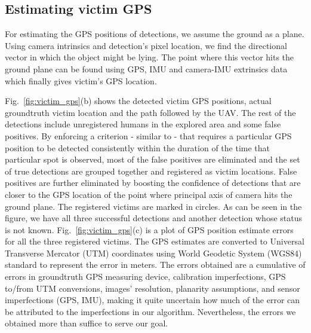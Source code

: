 \documentclass[runningheads]{llncs}
\begin{document}
\subsection{Estimating victim GPS}

For estimating the GPS positions of detections, we assume the ground as a plane. Using camera intrinsics and detection's pixel location, we find the directional vector in which the object might be lying. The point where this vector hits the ground plane can be found using GPS, IMU and camera-IMU extrinsics data which finally gives victim's GPS location.

Fig.~\ref{fig:victim_gps}(b) shows the detected victim GPS positions, actual groundtruth victim location and the path followed by the UAV. The rest of the detections include unregistered humans in the explored area and some false positives. By enforcing a criterion - similar to \cite{rudol2008human} - that requires a particular GPS position to be detected consistently within the duration of the time that particular spot is observed, most of the false positives are eliminated and the set of true detections are grouped together and registered as victim locations. False positives are further eliminated by boosting the confidence of detections that are closer to the GPS location of the point where principal axis of camera hits the ground plane. The registered victims are marked in circles. As can be seen in the figure, we have all three successful detections and another detection whose status is not known. Fig.~\ref{fig:victim_gps}(c) is a plot of GPS position estimate errors for all the three registered victims. The GPS estimates are converted to Universal Transverse Mercator (UTM) coordinates using World Geodetic System (WGS84) standard \cite{WGS} to represent the error in meters. The errors obtained are a cumulative of errors in groundtruth GPS measuring device, calibration imperfections, GPS to/from UTM conversions, images' resolution, planarity assumptions, and sensor imperfections (GPS, IMU), making it quite uncertain how much of the error can be attributed to the imperfections in our algorithm. Nevertheless, the errors we obtained more than suffice to serve our goal.
\end{document}
